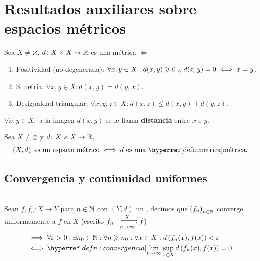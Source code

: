 \chapter{Resultados auxiliares sobre espacios métricos}

\begin{defn}[Métrica]\label{defn:metrica}
    Sea $X \neq \varnothing$, $d \colon X \times X \to \mathbb{R}$ es una métrica $\iff$
    \begin{enumerate}
        \item\label{defn:metrica:positividad} Positividad (no degenerada): $\forall x,y \in X : d(x,y) \geqslant 0 \; _{\wedge} \; d(x,y) = 0 \iff x = y$.
        \item\label{defn:metrica:simetria} Simetría: $\forall x,y \in X : d(x,y) = d(y,x)$.
        \item\label{defn:metrica:desigualdad-triangular} Desigualdad triangular: $\forall x,y,z \in X : d(x, z) \leq d(x,y) + d(y,z)$.
    \end{enumerate}
    $\forall x, y \in X:$ a la imagen $d(x,y)$ se le llama \textbf{distancia} entre $x$ e $y$.
\end{defn}

\begin{defn}\label{defn:esp-metrico}
    Sea $X \neq \varnothing$ y $d \colon X \times X \to \mathbb{R}$,
    \[
        \left(X, d\right) \tex{ es un espacio métrico}\iff d\tex{ es una \exhyperref[defn:metrica]{metrica}{métrica}}.
    \]
\end{defn}

\section{Convergencia y continuidad uniformes}

\begin{defn}\label{defn:convergencia-uniforme}\mbox{}\\
    Sean $f, f_n \colon X \to Y$ para $n\in \mathbb{N}$ con $\left(Y, d\right)$ un , decimos que $\left(f_n\right)_{n\in\mathbb{N}}$ converge uniformemente a $f$ en $X$ (escrito $f_n \xrightrightarrows[n\to\infty]{X} f$)
    \[\begin{aligned}
        &\iff \forall \varepsilon > 0 : \exists n_0 \in \N : \forall n \geq n_0 : \forall x \in X : d\left(f_n(x), f(x)\right) < \varepsilon \\
        &\iff \exhyperref[defn:convergencia]{convergencia}{\lim_{n\to\infty}} \sup_{x\in X} d\left(f_n(x), f(x)\right) = 0.
    \end{aligned}
    \]
\end{defn}

